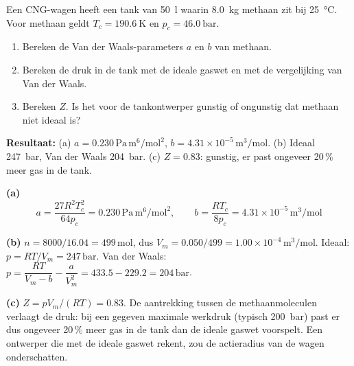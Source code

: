 \begin{oefening}\label{oef:h1-14}
Een CNG-wagen heeft een tank van \SI{50}{\litre} waarin \SI{8.0}{\kilogram} methaan zit bij \SI{25}{\celsius}. Voor methaan geldt $T_c = \SI{190.6}{\kelvin}$ en $p_c = \SI{46.0}{\bar}$.
\begin{enumerate}
\item[(a)] Bereken de Van der Waals-parameters $a$ en $b$ van methaan.
\item[(b)] Bereken de druk in de tank met de ideale gaswet en met de vergelijking van Van der Waals.
\item[(c)] Bereken $Z$. Is het voor de tankontwerper gunstig of ongunstig dat methaan niet ideaal is?
\end{enumerate}
\end{oefening}
\begin{oplossing}
\textbf{Resultaat:} (a) $a = 0.230\,\mathrm{Pa\,m^6/mol^2}$, $b = 4.31\times10^{-5}\,\mathrm{m^3/mol}$. (b) Ideaal \SI{247}{\bar}, Van der Waals \SI{204}{\bar}. (c) $Z = 0.83$: gunstig, er past ongeveer 20\,\% meer gas in de tank.

\textbf{(a)}
\[
a = \frac{27R^2T_c^2}{64p_c} = 0.230\,\mathrm{Pa\,m^6/mol^2}, \qquad b = \frac{RT_c}{8p_c} = 4.31\times10^{-5}\,\mathrm{m^3/mol}
\]

\textbf{(b)} $n = 8000/16.04 = 499\,\mathrm{mol}$, dus $V_m = 0.050/499 = 1.00\times10^{-4}\,\mathrm{m^3/mol}$. Ideaal: $p = RT/V_m = 247\,\mathrm{bar}$. Van der Waals: $p = \dfrac{RT}{V_m-b} - \dfrac{a}{V_m^2} = 433.5 - 229.2 = 204\,\mathrm{bar}$.

\textbf{(c)} $Z = pV_m/(RT) = 0.83$. De aantrekking tussen de methaanmoleculen verlaagt de druk: bij een gegeven maximale werkdruk (typisch 200~bar) past er dus ongeveer 20\,\% meer gas in de tank dan de ideale gaswet voorspelt. Een ontwerper die met de ideale gaswet rekent, zou de actieradius van de wagen onderschatten.
\end{oplossing}

